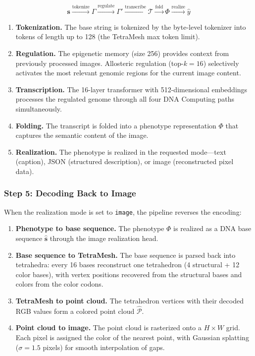 \begin{equation}
\boxed{
\mathbf{s} \xrightarrow{\text{tokenize}} \Gamma \xrightarrow{\text{regulate}} \Gamma' \xrightarrow{\text{transcribe}} \mathcal{T} \xrightarrow{\text{fold}} \Phi \xrightarrow{\text{realize}} \hat{y}
}
\label{eq:image-pipeline}
\end{equation}

\begin{enumerate}[leftmargin=1.8em]
  \item \textbf{Tokenization.} The base string is tokenized by the byte-level tokenizer into tokens of length up to 128 (the TetraMesh max token limit).
  \item \textbf{Regulation.} The epigenetic memory (size 256) provides context from previously processed images. Allosteric regulation (top-$k=16$) selectively activates the most relevant genomic regions for the current image content.
  \item \textbf{Transcription.} The 16-layer transformer with 512-dimensional embeddings processes the regulated genome through all four DNA Computing paths simultaneously.
  \item \textbf{Folding.} The transcript is folded into a phenotype representation $\Phi$ that captures the semantic content of the image.
  \item \textbf{Realization.} The phenotype is realized in the requested mode---text (caption), JSON (structured description), or image (reconstructed pixel data).
\end{enumerate}

\subsubsection{Step 5: Decoding Back to Image}

When the realization mode is set to \texttt{image}, the pipeline reverses the encoding:

\begin{enumerate}[leftmargin=1.8em]
  \item \textbf{Phenotype to base sequence.} The phenotype $\Phi$ is realized as a DNA base sequence $\hat{\mathbf{s}}$ through the image realization head.
  \item \textbf{Base sequence to TetraMesh.} The base sequence is parsed back into tetrahedra: every 16 bases reconstruct one tetrahedron (4 structural + 12 color bases), with vertex positions recovered from the structural bases and colors from the color codons.
  \item \textbf{TetraMesh to point cloud.} The tetrahedron vertices with their decoded RGB values form a colored point cloud $\hat{\mathcal{P}}$.
  \item \textbf{Point cloud to image.} The point cloud is rasterized onto a $H \times W$ grid. Each pixel is assigned the color of the nearest point, with Gaussian splatting ($\sigma = 1.5$ pixels) for smooth interpolation of gaps.
\end{enumerate}

